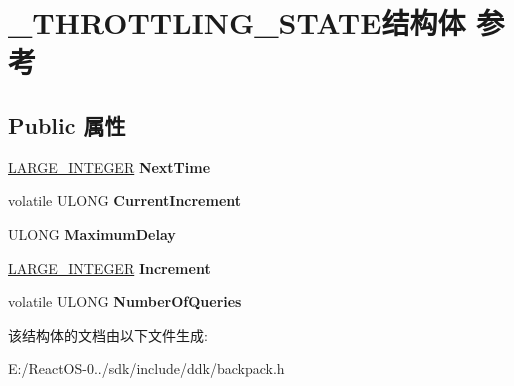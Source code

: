 \hypertarget{struct___t_h_r_o_t_t_l_i_n_g___s_t_a_t_e}{}\section{\+\_\+\+T\+H\+R\+O\+T\+T\+L\+I\+N\+G\+\_\+\+S\+T\+A\+T\+E结构体 参考}
\label{struct___t_h_r_o_t_t_l_i_n_g___s_t_a_t_e}
\subsection*{Public 属性}
\begin{DoxyCompactItemize}
\item 
\mbox{\label{struct___t_h_r_o_t_t_l_i_n_g___s_t_a_t_e_a369f12ae06969e9a9cdf9cfad3a9888b}} 
\hyperlink{union___l_a_r_g_e___i_n_t_e_g_e_r}{L\+A\+R\+G\+E\+\_\+\+I\+N\+T\+E\+G\+ER} {\bfseries Next\+Time}
\item 
\mbox{\label{struct___t_h_r_o_t_t_l_i_n_g___s_t_a_t_e_a9ed65d4f4770be66686b9422e91a03db}} 
volatile U\+L\+O\+NG {\bfseries Current\+Increment}
\item 
\mbox{\label{struct___t_h_r_o_t_t_l_i_n_g___s_t_a_t_e_a97ac93457976b5d46d13f90d19c133ca}} 
U\+L\+O\+NG {\bfseries Maximum\+Delay}
\item 
\mbox{\label{struct___t_h_r_o_t_t_l_i_n_g___s_t_a_t_e_a86db7d8c43f7d7649380133d659a8971}} 
\hyperlink{union___l_a_r_g_e___i_n_t_e_g_e_r}{L\+A\+R\+G\+E\+\_\+\+I\+N\+T\+E\+G\+ER} {\bfseries Increment}
\item 
\mbox{\label{struct___t_h_r_o_t_t_l_i_n_g___s_t_a_t_e_ae25216bec158f85d6eac51c8af16c3bb}} 
volatile U\+L\+O\+NG {\bfseries Number\+Of\+Queries}
\end{DoxyCompactItemize}


该结构体的文档由以下文件生成\+:\begin{DoxyCompactItemize}
\item 
E\+:/\+React\+O\+S-\/0../sdk/include/ddk/backpack.\+h\end{DoxyCompactItemize}
